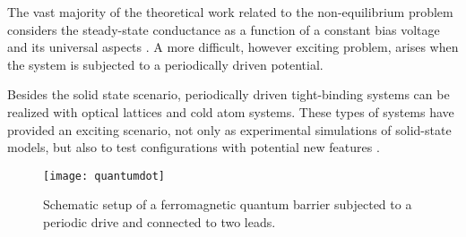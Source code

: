 \documentclass[aps,twocolumn,showpacs,floatfix,prl]{revtex4}
\begin{document}
The vast majority of the theoretical work related to the non-equilibrium problem 
{ considers}
the steady-state conductance as a function of a constant bias voltage \cite{Schiller.95,Majumdar.98,Oguri.01,Oguri.05,Hewson.05,Sela.09,Pletyukhov.12} and its universal aspects \cite{Doyon.06}. A more difficult, however exciting problem, arises when the system is subjected to a {periodically driven potential}. 

Besides
the solid state scenario, periodically driven tight-binding systems can be realized with
optical lattices and cold atom systems\cite{Bloch_05}. These types of systems have provided an exciting scenario,
not only as experimental simulations of solid-state models, but also to test configurations
with potential new features \cite{Bloch_05,Zhang_014,Greschner_015,aidelsburger2015measuring,douglas2015quantum,ponte2015many,ott14,shaking1,shaking2,agarwal17,PhysRevLett.118.260602}.
   

\begin{figure}[t]
\texttt{[image: quantumdot]}
 \caption{Schematic setup of a ferromagnetic quantum barrier %
subjected to a periodic drive and connected to two leads.}
\label{quantumdot}
\end{figure}
\end{document}
